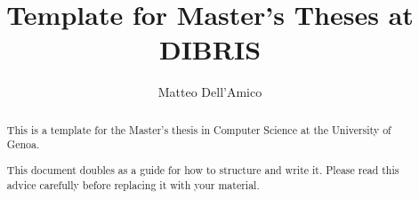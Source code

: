 \documentclass{masterthesis}
\begin{document}
\title{Template for Master's Theses at DIBRIS}

\author{Matteo Dell'Amico}



\maketitle

\begin{abstract}
This is a template for the Master's thesis in Computer Science at the University of Genoa.

This document doubles as a guide for how to structure and write it. Please read this advice carefully before replacing it with your material.
\end{abstract}

\tableofcontents













\printbibliography
% 
% 
\end{document}

